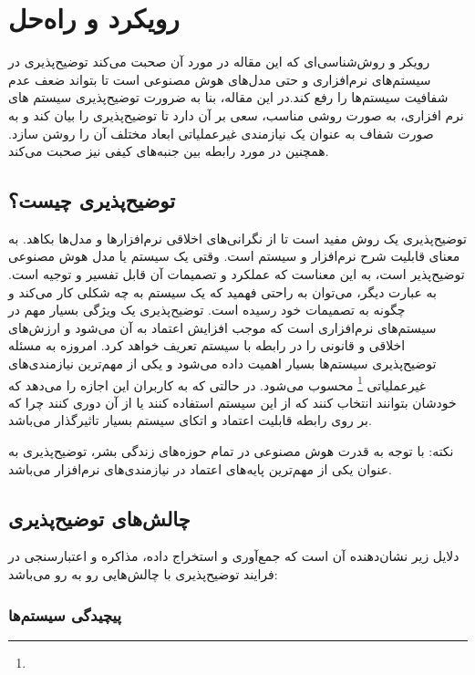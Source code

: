 \section{رویکرد و راه‌حل}

رویکر و روش‌شناسی‌ای که این مقاله در مورد آن صحبت می‌کند توضیح‌پذیری در
سیستم‌های نرم‌افزاری و حتی مدل‌های هوش مصنوعی است تا بتواند ضعف عدم شفافیت
سیستم‌ها را رفع کند.در این مقاله، بنا به ضرورت توضیح‌پذیری سیستم های نرم افزاری،
به صورت روشی مناسب، سعی بر آن دارد تا توضیح‌پذیری را بیان کند و به صورت شفاف به
عنوان یک نیازمندی غیرعملیاتی ابعاد مختلف آن را روشن سازد. همچنین در مورد رابطه
بین جنبه‌های کیفی نیز صحبت می‌کند.

\subsection{توضیح‌پذیری چیست؟}

توضیح‌پذیری یک روش مفید است تا از نگرانی‌های اخلاقی نرم‌افزار‌ها و مدل‌ها بکاهد.
به معنای قابلیت شرح نرم‌افزار و سیستم است. وقتی یک سیستم یا مدل هوش مصنوعی
توضیح‌پذیر است، به این معناست که عملکرد و تصمیمات آن قابل تفسیر و توجیه است. به
عبارت دیگر، می‌توان به راحتی فهمید که یک سیستم به چه شکلی کار می‌کند و چگونه به
تصمیمات خود رسیده است. توضیح‌پذیری یک ویژگی بسیار مهم در سیستم‌های نرم‌افزاری
است که موجب افزایش اعتماد به آن می‌شود و ارزش‌های اخلاقی و قانونی را در رابطه با
سیستم تعریف خواهد کرد. امروزه به مسئله توضیح‌پذیری سیستم‌ها بسیار اهمیت داده
می‌شود و یکی از مهم‌ترین نیازمندی‌های غیرعملیاتی \footnote{}
محسوب می‌شود. در حالتی که به کاربران این اجازه را می‌دهد که خودشان بتوانند
انتخاب کنند که از این سیستم استفاده کنند یا از آن دوری کنند چرا که بر روی رابطه
قابلیت اعتماد و اتکای سیستم بسیار تاثیرگذار می‌باشد.

نکته: با توجه به قدرت هوش مصنوعی در تمام حوزه‌های زندگی بشر، توضیح‌پذیری به
عنوان یکی از مهم‌ترین پایه‌های اعتماد در نیازمندی‌های نرم‌افزار می‌باشد.

\subsection{چالش‌های توضیح‌پذیری}

دلایل زیر نشان‌دهنده آن است که جمع‌آوری و استخراج داده، مذاکره و اعتبارسنجی در
فرایند توضیح‌پذیری با چالش‌هایی رو به رو می‌باشد:

\subsubsection{پیچیدگی سیستم‌ها}

